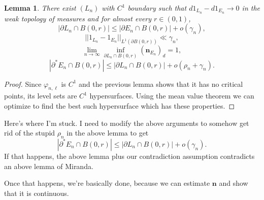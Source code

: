 \documentclass[reqno,12pt,letterpaper]{amsart}
\newcommand{\normal}{\mathbf n}
\newtheorem{lemma}[theorem]{Lemma}
\theoremstyle{definition}
\numberwithin{equation}{section}
\begin{document}
\begin{lemma}
There exist $(L_n)$ with $C^1$ boundary such that $d1_{L_n} - d1_{E_n} \to 0$ in the weak topology of measures and for almost every $r \in (0, 1)$,
$$|\partial L_n \cap B(0, r)| \leq |\partial E_n \cap B(0, r)| + o(\gamma_n),$$
$$||1_{L_n} - 1_{E_n}||_{L^1(\partial B(0, r))} \ll \gamma_n,$$
$$\lim_{n \to \infty} \inf_{\partial L_n \cap B(0, r)} (\normal_{E_n})_d = 1,$$
$$|\partial^* E_n \cap B(0, r)| \leq |\partial L_n \cap B(0, r)| + o(\rho_n + \gamma_n).$$
\end{lemma}
\begin{proof}
Since $\varphi_{n,\ell}$ is $C^1$ and the previous lemma shows that it has no critical points, its level sets are $C^1$ hypersurfaces.
Using the mean value theorem we can optimize to find the best such hypersurface which has these properties.
\end{proof}

Here's where I'm stuck. I need to modify the above arguments to somehow get rid of the stupid $\rho_n$ in the above lemma to get
$$|\partial^* E_n \cap B(0, r)| \leq |\partial L_n \cap B(0, r)| + o(\gamma_n).$$
If that happens, the above lemma plus our contradiction assumption contradicts an above lemma of Miranda.

Once that happens, we're basically done, because we can estimate $\normal$ and show that it is continuous.
\end{document}
